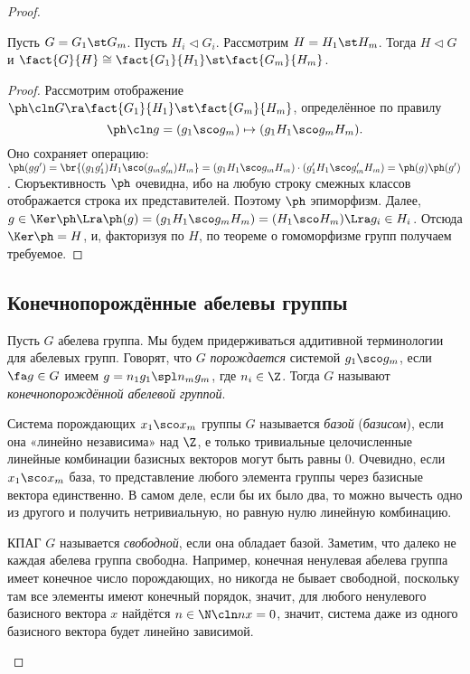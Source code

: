 \documentclass[a4paper]{article}
\newcommand{\kph}{\Ker \ph}
\begin{document}
\begin{proof}
\begin{theorem}
Пусть $G=G_1\st G_m$. Пусть $H_i \lhd G_i$. Рассмотрим $H=H_1\st H_m$.  Тогда $H \lhd G$ и $\fact{G}{H} \cong
\fact{G_1}{H_1}\st \fact{G_m}{H_m}$.
\end{theorem}
\begin{proof}
Рассмотрим отображение $\ph\cln G \ra \fact{G_1}{H_1}\st \fact{G_m}{H_m}$,
определённое по правилу
$$\ph\cln g = (g_1\sco g_m) \mapsto (g_1H_1\sco g_mH_m).$$
Оно сохраняет операцию: $\ph(gg')=\br{(g_1g_1')H_1\sco  (g_mg_m')H_m}=(g_1H_1\sco g_mH_m)\cdot(g_1'H_1\sco
g_m'H_m)=\ph(g)\ph(g')$. Сюръективность $\ph$ очевидна, ибо на любую строку смежных классов отображается
строка их представителей. Поэтому $\ph$ эпиморфизм. Далее, $g \in \kph \Lra \ph(g)= (g_1H_1\sco
g_mH_m)=(H_1\sco H_m) \Lra g_i \in H_i$. Отсюда $\kph = H$, и, факторизуя по $H$, по теореме о гомоморфизме
групп получаем требуемое.
\end{proof}

\subsection{Конечнопорождённые абелевы группы}

\begin{df}
Пусть $G$ абелева группа. Мы будем придерживаться аддитивной  терминологии для абелевых групп. Говорят, что
$G$ \emph{порождается} системой $g_1\sco g_m$, если $\fa g \in G$ имеем $g=n_1g_1 \spl n_mg_m$, где $n_i \in
\Z$. Тогда $G$ называют \emph{конечнопорождённой абелевой группой}.
\end{df}

\begin{df}
Система порождающих $x_1\sco x_m$ группы $G$ называется \emph{базой}  (\emph{базисом}), если она «линейно
независима» над $\Z$, е только тривиальные целочисленные линейные комбинации базисных векторов могут быть
равны 0. Очевидно, если $x_1\sco x_m$ база, то представление любого элемента группы через базисные вектора
единственно. В самом деле, если бы их было два, то можно вычесть одно из другого и получить нетривиальную, но
равную нулю линейную комбинацию.
\end{df}

\begin{df}
КПАГ $G$ называется \emph{свободной}, если она обладает базой. Заметим,  что далеко не каждая абелева группа
свободна. Например, конечная ненулевая абелева группа имеет конечное число порождающих, но никогда не бывает
свободной, поскольку там все элементы имеют конечный порядок, значит, для любого ненулевого базисного вектора
$x$ найдётся $n \in \N\cln nx=0$, значит, система даже из одного базисного вектора будет линейно зависимой.
\end{df}


\end{proof}
\end{document}
